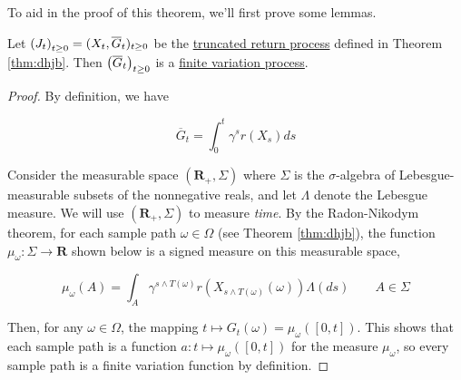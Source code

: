 To aid in the proof of this theorem, we'll first prove some
lemmas.

\begin{lemma}\label{lem:finite-variation}
  Let $\indexedabove{t}{J}=(X_t, \overline{G}_t)_{t\geq 0}$ be
  the \hyperref[def:truncated-return]{truncated return process} defined
  in Theorem \ref{thm:dhjb}. Then $\indexedabove{t}{\overline{G}}$ is
  a \hyperref[app:finite-variation]{finite variation process}.
\end{lemma}
\begin{proof}
  By definition, we have

  \begin{equation*}
    \overline{G}_t = \int_0^t\gamma^sr(X_s)ds
  \end{equation*}

  Consider the measurable space $(\mathbf{R}_+, \Sigma)$ where
  $\Sigma$ is the $\sigma$-algebra of Lebesgue-measurable subsets of
  the nonnegative reals, and let $\Lambda$ denote the Lebesgue
  measure. We will use $(\mathbf{R}_+,\Sigma)$ to measure \emph{time}. 
  By the Radon-Nikodym theorem, for each sample path $\omega\in\Omega$ (see
  Theorem \ref{thm:dhjb}), the function
  $\mu_\omega:\Sigma\to\mathbf{R}$ shown below is a signed measure on this
  measurable space,

  \begin{equation*}
    \mu_\omega(A) = \int_A\gamma^{s\land T(\omega)}r(X_{s\land T(\omega)}(\omega))\Lambda(ds)\qquad A\in\Sigma
  \end{equation*}

  Then, for any $\omega\in\Omega$, the mapping $t\mapsto G_t(\omega) =
  \mu_\omega([0,t])$. This shows that each sample path is a function
  $a:t\mapsto\mu_\omega([0,t])$ for the measure $\mu_\omega$, so every sample path
  is a finite variation function by definition.
\end{proof}

